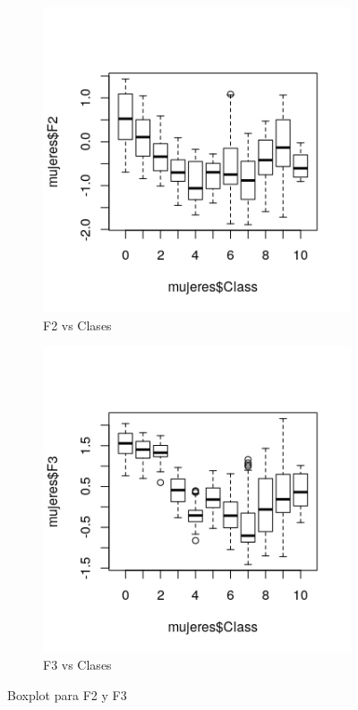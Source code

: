 \begin{itemize}
\begin{itemize}
		\begin{figure}[H]
			\centering
			\begin{subfigure}{.5\textwidth}
				\centering
				\includegraphics[width=.8\linewidth]{bpmF2.png}
				\caption{F2 vs Clases}
				\label{fig:bpmF2}
			\end{subfigure}%
			\begin{subfigure}{.5\textwidth}
				\centering
				\includegraphics[width=.8\linewidth]{bpmF3.png}
				\caption{F3 vs Clases}
				\label{fig:bpmF3}
			\end{subfigure}
			\caption{Boxplot para F2 y F3}
			\label{fig:bpm23}
		\end{figure}
	

\end{itemize}
\end{itemize}
